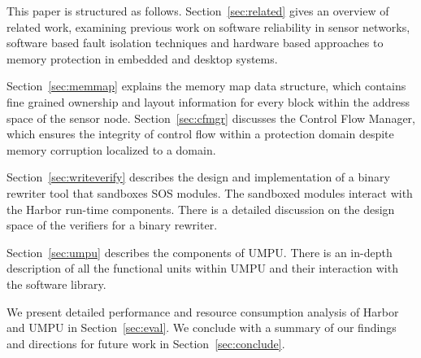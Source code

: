 This paper is structured as follows.
%
Section~\ref{sec:related} gives an overview of related work,
examining previous work on software reliability in sensor networks,
software based fault isolation techniques and hardware based
approaches to memory protection in embedded and desktop systems.
%

Section~\ref{sec:memmap} explains the memory map data structure, which
contains fine grained ownership and layout information for every block
within the address space of the sensor node. 
%
Section~\ref{sec:cfmgr} discusses the Control Flow Manager, which
ensures the integrity of control flow within a protection domain
despite memory corruption localized to a domain.

Section~\ref{sec:writeverify} describes the design and implementation
of a binary rewriter tool that sandboxes SOS modules.
%
The sandboxed modules interact with the Harbor run-time components.
%
There is a detailed discussion on the design space of the verifiers
for a binary rewriter.

Section~\ref{sec:umpu} describes the components of UMPU.
%
There is an in-depth 
description of all the functional units
within UMPU and their interaction with the software library.

We present detailed performance and resource consumption analysis of
Harbor and UMPU in Section~\ref{sec:eval}.
%
We conclude with a summary of our findings and directions for future
work in Section~\ref{sec:conclude}.
